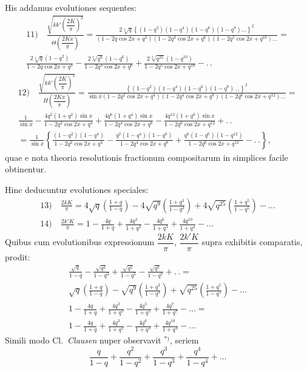\documentclass{article}
\begin{document}
His addamus evolutiones sequentes:
\[
\begin{gathered}
\text{11)}\quad\frac{\sqrt{kk'\left(\dfrac{2K}{\pi}\right)^{3}}}{\Theta\left(\dfrac{2Kx}{\pi}\right)}=\frac{2\sqrt[4]{q}\left\{(1-q^{2})(1-q^{4})(1-q^{6})(1-q^{8})\ldots\right\}^{2}}{(1-2q\cos 2x+q^{2})(1-2q^{3}\cos 2x+q^{6})(1-2q^{5}\cos 2x+q^{10})\ldots}=\\[2ex]
\frac{2\sqrt[4]{q}(1-q^{2})}{1-2q\cos 2x+q^{3}}-\frac{2\sqrt[4]{q^{9}}(1-q^{6})}{1-2q^{3}\cos 2x+q^{6}}+\frac{2\sqrt[4]{q^{25}}(1-q^{10})}{1-2q^{5}\cos 2x+q^{10}}-.\,.
\end{gathered}
\]
\[
\begin{gathered}
\text{12)}\quad\frac{\sqrt{kk'\left(\dfrac{2K}{\pi}\right)^{3}}}{H\left(\dfrac{2Kx}{\pi}\right)}=\frac{\left\{(1-q^{2})(1-q^{4})(1-q^{6})(1-q^{8})\,.\,.\right\}^{2}}{\sin x(1-2q^{2}\cos 2x+q^{4})(1-2q^{4}\cos 2x+q^{8})(1-2q^{6}\cos 2x+q^{12})\ldots}=\\[2ex]
\frac{1}{\sin x}-\frac{4q^{2}(1+q^{2})\sin x}{1-2q^{2}\cos 2x+q^{4}}+\frac{4q^{6}(1+q^{4})\sin x}{1-2q^{4}\cos 2x+q^{8}}-\frac{4q^{12}(1+q^{6})\sin x}{1-2q^{6}\cos 2x+q^{12}}+.\,.\\[2ex]
=\frac{1}{\sin x}\left\{\frac{(1-q^{2})(1-q^{4})}{1-2q^{2}\cos 2x+q^{4}}-\frac{q^{2}(1-q^{4})(1-q^{8})}{1-2q^{4}\cos 2x+q^{8}}+\frac{q^{6}(1-q^{6})(1-q^{12})}{1-2q^{6}\cos 2x+q^{12}}-.\,.\right\},
\end{gathered}
\]
quae e nota theoria resolutionis fractionum compositarum in simplices facile obtinentur.

Hinc deducuntur evolutiones speciales:
\[
\begin{gathered}
\text{13)}\quad\frac{2kK}{\pi}=4\sqrt{q}\left(\frac{1+q}{1-q}\right)-4\sqrt{q^{9}}\left(\frac{1+q^{3}}{1-q^{3}}\right)+4\sqrt{q^{25}}\left(\frac{1+q^{5}}{1-q^{5}}\right)-\ldots\\[2ex]
\text{14)}\quad\frac{2k'K}{\pi}=1-\frac{4q}{1+q}+\frac{4q^{3}}{1+q^{2}}-\frac{4q^{6}}{1+q^{3}}+\frac{4q^{10}}{1+q^{4}}-\ldots
\end{gathered}
\]
Quibus cum evolutionibus expressionum $\dfrac{2kK}{\pi}$, $\dfrac{2k'K}{\pi}$ supra exhibitis comparatis, prodit:
\[
\begin{gathered}
\frac{\sqrt{q}}{1-q}-\frac{\sqrt{q^{3}}}{1-q^{3}}+\frac{\sqrt{q^{5}}}{1-q^{5}}-\frac{\sqrt{q^{7}}}{1-q^{7}}+.\,.=\\[1.5ex]
\sqrt{q}\left(\frac{1+q}{1-q}\right)-\sqrt{q^{9}}\left(\frac{1+q^{3}}{1-q^{3}}\right)+\sqrt{q^{25}}\left(\frac{1+q^{5}}{1-q^{5}}\right)-\ldots\\[2ex]
1-\frac{4q}{1+q}+\frac{4q^{3}}{1+q^{3}}-\frac{4q^{5}}{1+q^{5}}+\frac{4q^{7}}{1+q^{7}}-\ldots=\\[1.5ex]
1-\frac{4q}{1+q}+\frac{4q^{3}}{1+q^{2}}-\frac{4q^{6}}{1+q^{3}}+\frac{4q^{10}}{1+q^{4}}-\ldots
\end{gathered}
\]
Simili modo Cl.\ \emph{Clausen} nuper observavit ${}^{*)}$, seriem
\[
\frac{q}{1-q}+\frac{q^{2}}{1-q^{2}}+\frac{q^{3}}{1-q^{3}}+\frac{q^{4}}{1-q^{4}}+\ldots
\]
\end{document}
